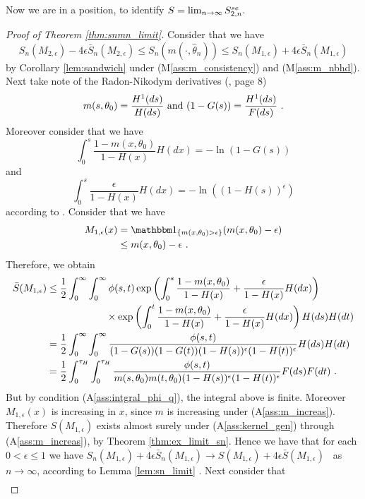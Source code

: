 Now we are in a position, to identify $S = \lim_{n\to\infty} S_{2,n}^{se}$. 
\begin{proof}[Proof of Theorem \ref{thm:snmn_limit}]
	Consider that we have
	$$S_n(M_{2,\epsilon}) - 4\epsilon \bar{S}_n(M_{2,\epsilon}) \leq S_n(m(\cdot, \hat\theta_n)) \leq S_n(M_{1,\epsilon}) + 4\epsilon \bar{S}_n(M_{1,\epsilon})$$
	by Corollary \ref{lem:sandwich} under (M\ref{ass:m_consistency}) and (M\ref{ass:m_nbhd}). Next take note of the Radon-Nikodym derivatives (\cf \cite{dikta2000strong}, page 8)
	$$m(s,\theta_0) = \frac{H^1(ds)}{H(ds)} \textrm{ and } (1-G(s)) = \frac{H^1(ds)}{F(ds)}\textrm{ .}$$
	Moreover consider that we have
	$$\int_{0}^{s} \frac{1-m(x,\theta_0)}{1-H(x)} H(dx) = -\ln(1-G(s))$$
	and 
	$$\int_{0}^{s} \frac{\epsilon}{1-H(x)} H(dx)= -\ln((1-H(s))^\epsilon)$$
	according to \cite{dikta2000strong}.
	Consider that we have 
	\begin{align*}
		M_{1,\epsilon}(x) &= \I{ m(x,\theta_0)>\epsilon}(m(x,\theta_0)-\epsilon)\\
		&\leq m(x,\theta_0)-\epsilon \mdot
	\end{align*}
	Therefore, we obtain
	\begin{align*}
		\bar{S}(M_{1,\epsilon}) &\leq \frac{1}{2}\int_{0}^{\infty} \int_{0}^{\infty} \phi(s,t)  \exp\left(\int_{0}^{s} \frac{1-m(x,\theta_0)}{1-H(x)} + \frac{\epsilon}{1-H(x)} H(dx)\right)\\
		&\qquad\qquad\qquad \times \exp\left(\int_{0}^{t} \frac{1-m(x,\theta_0)}{1-H(x)} + \frac{\epsilon}{1-H(x)} H(dx) \right)H(ds)H(dt)\\
		&= \frac{1}{2}\int_{0}^{\infty} \int_{0}^{\infty} \frac{\phi(s,t)}{(1-G(s))(1-G(t))(1-H(s))^\epsilon(1-H(t))^\epsilon} H(ds)H(dt)\\
		&= \frac{1}{2}\int_{0}^{\tau_H} \int_{0}^{\tau_H} \frac{\phi(s,t)}{m(s,\theta_0)m(t,\theta_0)(1-H(s))^\epsilon(1-H(t))^\epsilon} F(ds)F(dt)\textrm{ .}
	\end{align*}
	But by condition (A\ref{ass:intgral_phi_q}), the integral above is finite. Moreover $M_{1,\epsilon}(x)$ is increasing in $x$, since $m$ is increasing under (A\ref{ass:m_increas}). Therefore $S(M_{1,\epsilon})$ exists almost surely under (A\ref{ass:kernel_gen}) through (A\ref{ass:m_increas}), by Theorem \ref{thm:ex_limit_sn}. Hence we have that for each $0<\epsilon\leq1$ we have $S_n(M_{1,\epsilon}) + 4\epsilon \bar{S}_n(M_{1,\epsilon}) \to S(M_{1,\epsilon}) + 4\epsilon \bar{S}(M_{1,\epsilon})$ \wpo\ as $n\to\infty$, according to Lemma \ref{lem:sn_limit} . 
	Next consider that 
	\begin{align*}

\end{align*}
\end{proof}
